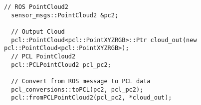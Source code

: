 \begin{lstlisting}[caption=Conversión de mensaje ROS a PCL, label=lst:pc2pcl]
  // ROS PointCloud2
  sensor_msgs::PointCloud2 &pc2;
  
  // Output Cloud
  pcl::PointCloud<pcl::PointXYZRGB>::Ptr cloud_out(new pcl::PointCloud<pcl::PointXYZRGB>);
  // PCL PointCloud2
  pcl::PCLPointCloud2 pcl_pc2;   

  // Convert from ROS message to PCL data
  pcl_conversions::toPCL(pc2, pcl_pc2);
  pcl::fromPCLPointCloud2(pcl_pc2, *cloud_out);
\end{lstlisting}